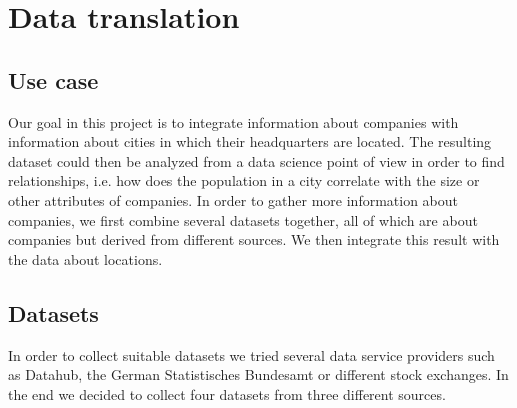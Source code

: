 \section{Data translation}
\subsection{Use case}
Our goal in this project is to integrate information about companies with information about cities in which their headquarters are located. The resulting dataset could then be analyzed from a data science point of view in order to find relationships, i.e. how does the population in a city correlate with the size or other attributes of companies. In order to gather more information about companies, we first combine several datasets together, all of which are about companies but derived from different sources. We then integrate this result with the data about locations.

%


\subsection{Datasets}
In order to collect suitable datasets we tried several data service providers such as Datahub, the German Statistisches Bundesamt or different stock exchanges. In the end we decided to collect four datasets from three different sources. 

